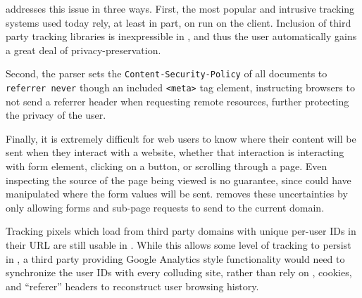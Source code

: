 \CDF addresses this issue in three ways.  First, the most popular and intrusive
tracking systems used today rely, at least in part, on \JS run on the client.
Inclusion of third party tracking libraries is inexpressible in \CDF, and thus
the user automatically gains a great deal of privacy-preservation.

Second, the \CDF parser sets the \texttt{Content-Security-Policy} of all
documents to \texttt{referrer never} though an included \texttt{<meta>} tag
element, instructing browsers to not send a referrer header when requesting
remote resources, further protecting the privacy of the user.

Finally, it is extremely difficult for web users to know where their content
will be sent when they interact with a website, whether that interaction
is interacting with form element, clicking on a button, or scrolling through
a page.  Even inspecting the source \HTML of the page being viewed is no
guarantee, since \JS could have manipulated where the form values will be sent.
\CDF removes these uncertainties by only allowing forms and sub-page requests
to send to the current domain.

Tracking pixels which load from third party domains with unique per-user IDs in
their URL are still usable in \CDF. While this allows some level of tracking to
persist in \CDF, a third party providing Google Analytics style functionality
would need to synchronize the user IDs with every colluding site, rather than
rely on \JS, cookies, and ``referer'' headers to reconstruct user browsing
history.
